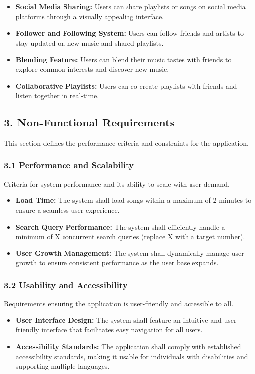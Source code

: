 \documentclass[a4paper,10pt]{article}
\begin{document}
\begin{itemize}[leftmargin=*]
    \item \textbf{Social Media Sharing:} Users can share playlists or songs on social media platforms through a visually appealing interface.
    \item \textbf{Follower and Following System:} Users can follow friends and artists to stay updated on new music and shared playlists.
    \item \textbf{Blending Feature:} Users can blend their music tastes with friends to explore common interests and discover new music.
    \item \textbf{Collaborative Playlists:} Users can co-create playlists with friends and listen together in real-time.
\end{itemize}

\subsection*{3. Non-Functional Requirements}
This section defines the performance criteria and constraints for the application.

\subsubsection*{3.1 Performance and Scalability}
Criteria for system performance and its ability to scale with user demand.

\begin{itemize}[leftmargin=*]
    \item \textbf{Load Time:} The system shall load songs within a maximum of 2 minutes to ensure a seamless user experience.
    \item \textbf{Search Query Performance:} The system shall efficiently handle a minimum of X concurrent search queries (replace X with a target number).
    \item \textbf{User Growth Management:} The system shall dynamically manage user growth to ensure consistent performance as the user base expands.
\end{itemize}

\subsubsection*{3.2 Usability and Accessibility}
Requirements ensuring the application is user-friendly and accessible to all.

\begin{itemize}[leftmargin=*]
    \item \textbf{User Interface Design:} The system shall feature an intuitive and user-friendly interface that facilitates easy navigation for all users.
    \item \textbf{Accessibility Standards:} The application shall comply with established accessibility standards, making it usable for individuals with disabilities and supporting multiple languages.
\end{itemize}
\end{document}
